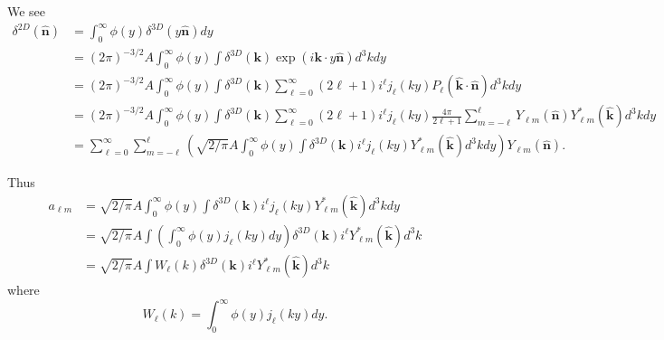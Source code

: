 \documentclass[11pt]{article}
\begin{document}
We see
\begin{equation}
\begin{split}
\delta^{2D}(\boldsymbol{\hat{n}}) &= \int_0^{\infty} \phi(y) \delta^{3D}(y \boldsymbol{\hat{n}}) dy \\
&= (2\pi)^{-3/2} A \int_0^{\infty} \phi(y) \int \delta^{3D}(\boldsymbol{k}) \exp(i \boldsymbol{k} \cdot y\boldsymbol{\hat{n}}) d^3k dy \\
&= (2\pi)^{-3/2} A \int_0^{\infty} \phi(y) \int \delta^{3D}(\boldsymbol{k}) \sum_{\ell=0}^\infty (2 \ell +1) i^{\ell} j_{\ell}(ky) P_{\ell}(\boldsymbol{\hat{k}} \cdot \boldsymbol{\hat{n}}) d^3k dy \\
&= (2\pi)^{-3/2} A \int_0^{\infty} \phi(y) \int \delta^{3D}(\boldsymbol{k}) \sum_{\ell=0}^\infty (2 \ell +1) i^{\ell} j_{\ell}(ky) \frac{4 \pi}{2 \ell + 1}\sum_{m=-\ell}^{\ell} Y_{\ell m}(\boldsymbol{\hat{n}}) Y_{\ell m}^{\ast}(\boldsymbol{\hat{k}}) d^3k dy \\
&= \sum_{\ell=0}^\infty \sum_{m=-\ell}^{\ell} \left( \sqrt{2/\pi} A \int_0^{\infty} \phi(y) \int \delta^{3D}(\boldsymbol{k}) i^{\ell} j_{\ell}(ky)  Y_{\ell m}^{\ast}(\boldsymbol{\hat{k}}) d^3k dy \right) Y_{\ell m}(\boldsymbol{\hat{n}}).
\end{split}
\end{equation}

Thus
\begin{equation}
\begin{split}
a_{\ell m} &= \sqrt{2/\pi} A \int_0^{\infty} \phi(y) \int \delta^{3D}(\boldsymbol{k}) i^{\ell} j_{\ell}(ky)  Y_{\ell m}^{\ast}(\boldsymbol{\hat{k}}) d^3k dy \\
&= \sqrt{2/\pi} A \int \left( \int_0^{\infty} \phi(y) j_{\ell}(ky) dy \right) \delta^{3D}(\boldsymbol{k}) i^{\ell}   Y_{\ell m}^{\ast}(\boldsymbol{\hat{k}}) d^3k  \\
&= \sqrt{2/\pi} A \int W_{\ell}(k) \delta^{3D}(\boldsymbol{k}) i^{\ell}   Y_{\ell m}^{\ast}(\boldsymbol{\hat{k}}) d^3k 
\end{split}
\end{equation}
where
\begin{equation}
W_{\ell}(k) = \int_0^{\infty} \phi(y) j_{\ell}(ky) dy.
\end{equation}
\end{document}
